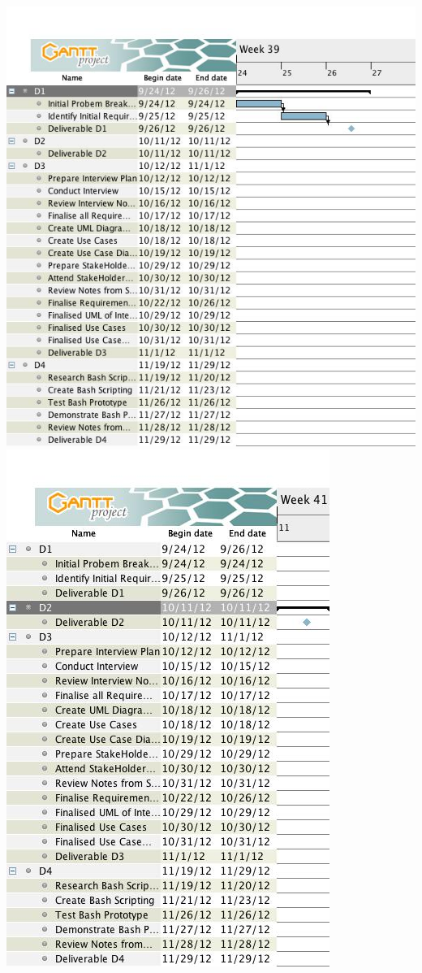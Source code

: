 \documentclass{l3deliverable}
\begin{document}
{\includegraphics[scale=0.7]{img/GANTTD1.jpg}\\
\includegraphics[scale=0.7]{img/GANTTD2.jpg}\\
}
\end{document}
